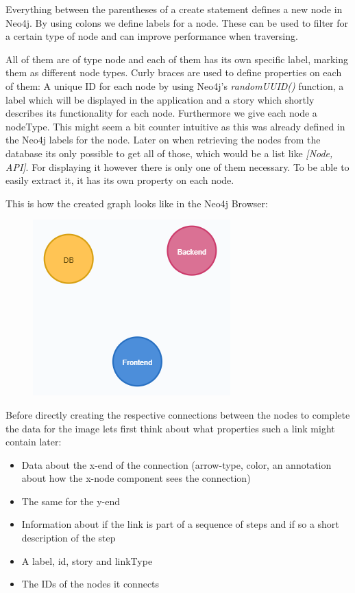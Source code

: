 Everything between the parentheses of a create statement defines a new node in Neo4j. By using colons we define labels for a node. These can be used to filter for a certain type of node and can improve performance when traversing. 

All of them are of type node and each of them has its own specific label, marking them as different node types. Curly braces are used to define properties on each of them: A unique ID for each node by using Neo4j's \emph{randomUUID()} function, a label which will be displayed in the application and a story which shortly describes its functionality for each node. Furthermore we give each node a nodeType. This might seem a bit counter intuitive as this was already defined in the Neo4j labels for the node.
Later on when retrieving the nodes from the database its only possible to get all of those, which would be a list like \emph{[Node, API]}. For displaying it however there is only one of them necessary. To be able to easily extract it, it has its own property on each node.

This is how the created graph looks like in the Neo4j Browser:
\begin{figure}[H]
\centering
\includegraphics[scale=1]{Bilder/BasicGraphNeo1.png}
\label{ex422}
\end{figure}

Before directly creating the respective connections between the nodes to complete the data for the image lets first think about what properties such a link might contain later:
\begin{itemize}
\item Data about the x-end of the connection (arrow-type, color, an annotation about how the x-node component sees the connection)
\item The same for the y-end
\item Information about if the link is part of a sequence of steps and if so a short description of the step
\item A label, id, story and linkType
\item The IDs of the nodes it connects
\end{itemize}

